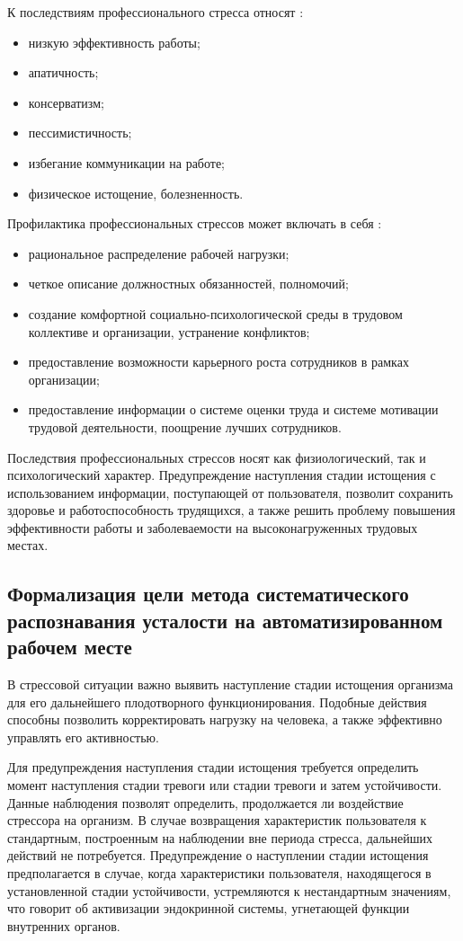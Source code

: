 К последствиям профессионального стресса относят \cite{professionalStress}:
\begin{itemize}[leftmargin=1.6\parindent]
\item низкую эффективность работы;
\item апатичность;
\item консерватизм;
\item пессимистичность;
\item избегание коммуникации на работе;
\item физическое истощение, болезненность.
\end{itemize}

Профилактика профессиональных стрессов может включать в себя \cite{professionalStress}:
\begin{itemize}[leftmargin=1.6\parindent]
\item рациональное распределение рабочей нагрузки;
\item четкое описание должностных обязанностей, полномочий;
\item создание комфортной социально-психологической среды в трудовом коллективе и организации, устранение конфликтов;
\item предоставление возможности карьерного роста сотрудников в рамках организации;
\item предоставление информации о системе оценки труда и системе мотивации трудовой деятельности, поощрение лучших сотрудников.
\end{itemize}

Последствия профессиональных стрессов носят как физиологический, так и психологический характер. Предупреждение наступления стадии истощения с использованием информации, поступающей от пользователя, позволит сохранить здоровье и работоспособность трудящихся, а также решить проблему повышения эффективности работы и заболеваемости на высоконагруженных трудовых местах.

\subsection{Формализация цели метода систематического распознавания усталости на автоматизированном рабочем месте}
В стрессовой ситуации важно выявить наступление стадии истощения организма для его дальнейшего плодотворного функционирования. Подобные действия способны позволить корректировать нагрузку на человека, а также эффективно управлять его активностью.

Для предупреждения наступления стадии истощения требуется определить момент наступления стадии тревоги или стадии тревоги и затем устойчивости. Данные наблюдения позволят определить, продолжается ли воздействие стрессора на организм. В случае возвращения характеристик пользователя к стандартным, построенным на наблюдении вне периода стресса, дальнейших действий не потребуется. Предупреждение о наступлении стадии истощения предполагается в случае, когда характеристики пользователя, находящегося в установленной стадии устойчивости, устремляются к нестандартным значениям, что говорит об активизации эндокринной системы, угнетающей функции внутренних органов.

